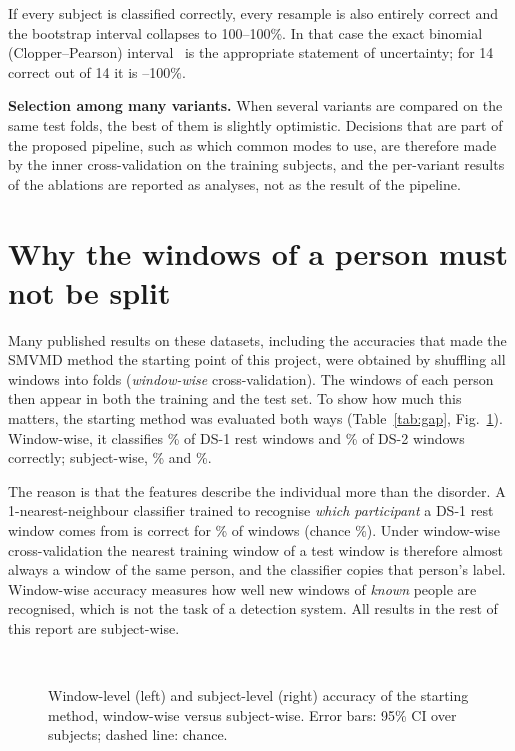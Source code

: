 If every subject is classified correctly, every resample is also entirely correct and the
bootstrap interval collapses to 100--100\%. In that case the exact binomial (Clopper--Pearson)
interval~\cite{clopper1934} is the appropriate statement of uncertainty; for 14 correct out of
14 it is --100\%.

\textbf{Selection among many variants.} When several variants are compared on the same test
folds, the best of them is slightly optimistic. Decisions that are part of the proposed pipeline,
such as which common modes to use, are therefore made by the inner cross-validation on the
training subjects, and the per-variant results of the ablations are reported as analyses, not as
the result of the pipeline.

\section{Why the windows of a person must not be split}
\label{sec:whysubject}
Many published results on these datasets, including the accuracies that made the SMVMD method
the starting point of this project, were obtained by shuffling all windows into folds
(\emph{window-wise} cross-validation). The windows of each person then appear in both the
training and the test set. To show how much this matters, the starting method was evaluated
both ways (Table~\ref{tab:gap}, Fig.~\ref{fig:gap}). Window-wise, it classifies
\% of DS-1 rest windows and \% of DS-2 windows
correctly; subject-wise, \% and \%.

The reason is that the features describe the individual more than the disorder. A
1-nearest-neighbour classifier trained to recognise \emph{which participant} a DS-1 rest window
comes from is correct for \% of windows (chance \%).
Under window-wise cross-validation the nearest training window of a test window is therefore
almost always a window of the same person, and the classifier copies that person's label.
Window-wise accuracy measures how well new windows of \emph{known} people are recognised, which
is not the task of a detection system. All results in the rest of this report are subject-wise.

\begin{table}[H]
\caption{The starting method (SMVMD features + mRMR + KNN) under window-wise and subject-wise
cross-validation. Window accuracy (\%); brackets: 95\% CI over subjects.}
\label{tab:gap}\centering
{}\\[2pt]
{\footnotesize \dstwonote}
\end{table}

\begin{figure}[H]\centering
{}
\caption{Window-level (left) and subject-level (right) accuracy of the starting method,
window-wise versus subject-wise. Error bars: 95\% CI over subjects; dashed line: chance.}
\label{fig:gap}
\end{figure}
